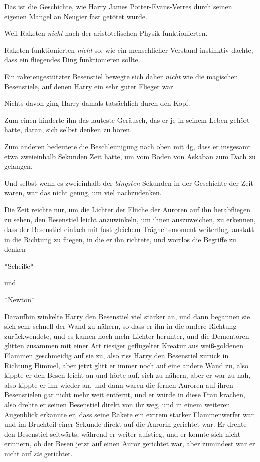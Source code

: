 {Das ist die Geschichte, wie Harry James Potter-Evans-Verres durch seinen eigenen Mangel an Neugier fast getötet wurde.

Weil Raketen \emph{nicht} nach der aristotelischen Physik funktionierten.

Raketen funktionierten \emph{nicht} so, wie ein menschlicher Verstand instinktiv dachte, dass ein fliegendes Ding funktionieren sollte.

Ein raketengestützter Besenstiel bewegte sich daher \emph{nicht} wie die magischen Besenstiele, auf denen Harry ein sehr guter Flieger war.

Nichts davon ging Harry damals tatsächlich durch den Kopf.

Zum einen hinderte ihn das lauteste Geräusch, das er je in seinem Leben gehört hatte, daran, sich selbst denken zu hören.

Zum anderen bedeutete die Beschleunigung nach oben mit 4g, dass er insgesamt etwa zweieinhalb Sekunden Zeit hatte, um vom Boden von Askaban zum Dach zu gelangen.

Und selbst wenn es zweieinhalb der \emph{längsten} Sekunden in der Geschichte der Zeit waren, war das nicht genug, um viel nachzudenken.

Die Zeit reichte nur, um die Lichter der Flüche der Auroren auf ihn herabfliegen zu sehen, den Besenstiel leicht anzuwinkeln, um ihnen auszuweichen, zu erkennen, dass der Besenstiel einfach mit fast gleichem Trägheitsmoment weiterflog, anstatt in die Richtung zu fliegen, in die er ihn richtete, und wortlos die Begriffe zu denken

*Scheiße*

und

*Newton*

Daraufhin winkelte Harry den Besenstiel viel stärker an, und dann begannen sie sich sehr schnell der Wand zu nähern, so dass er ihn in die andere Richtung zurückwendete, und es kamen noch mehr Lichter herunter, und die Dementoren glitten zusammen mit einer Art riesiger geflügelter Kreatur aus weiß-goldenen Flammen geschmeidig auf sie zu, also riss Harry den Besenstiel zurück in Richtung Himmel, aber jetzt glitt er immer noch auf eine andere Wand zu, also kippte er den Besen leicht an und hörte auf, sich zu nähern, aber er war zu nah, also kippte er ihn wieder an, und dann waren die fernen Auroren auf ihren Besenstielen gar nicht mehr weit entfernt, und er würde in diese Frau krachen, also drehte er seinen Besenstiel direkt von ihr weg, und in einem weiteren Augenblick erkannte er, dass seine Rakete ein extrem starker Flammenwerfer war und im Bruchteil einer Sekunde direkt auf die Aurorin gerichtet war. Er drehte den Besenstiel seitwärts, während er weiter aufstieg, und er konnte sich nicht erinnern, ob der Besen jetzt auf einen Auror gerichtet war, aber zumindest war er nicht auf \emph{sie} gerichtet.

}
